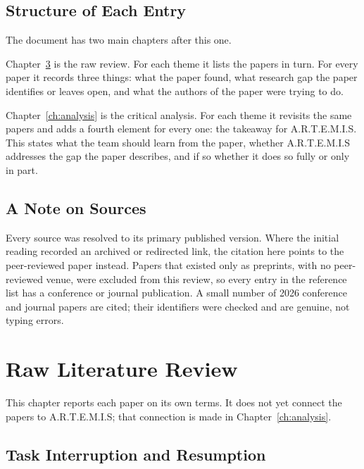 \documentclass[11pt,a4paper]{report}
\newcommand{\artemis}{A.R.T.E.M.I.S}
\begin{document}
\section{Structure of Each Entry}

The document has two main chapters after this one.

Chapter~\ref{ch:raw} is the raw review. For each theme it lists the
papers in turn. For every paper it records three things: what the paper
found, what research gap the paper identifies or leaves open, and what
the authors of the paper were trying to do.

Chapter~\ref{ch:analysis} is the critical analysis. For each theme it
revisits the same papers and adds a fourth element for every one: the
takeaway for \artemis{}. This states what the team should learn from
the paper, whether \artemis{} addresses the gap the paper describes,
and if so whether it does so fully or only in part.

\section{A Note on Sources}

Every source was resolved to its primary published version. Where the
initial reading recorded an archived or redirected link, the citation
here points to the peer-reviewed paper instead. Papers that existed only
as preprints, with no peer-reviewed venue, were excluded from this
review, so every entry in the reference list has a conference or journal
publication. A small number of 2026 conference and journal papers are
cited; their identifiers were checked and are genuine, not typing
errors.

\chapter{Raw Literature Review}
\label{ch:raw}

This chapter reports each paper on its own terms. It does not yet
connect the papers to \artemis{}; that connection is made in
Chapter~\ref{ch:analysis}.

\section{Task Interruption and Resumption}
\end{document}

